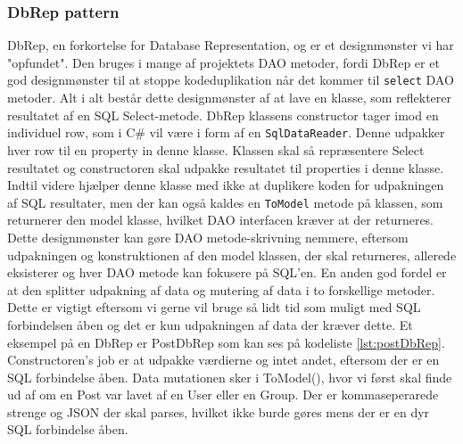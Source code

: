 \subsubsection{DbRep pattern}\label{sec:dbRep}
DbRep, en forkortelse for Database Representation, og er et designmønster vi har "opfundet". Den bruges i mange af projektets DAO metoder, fordi DbRep er et god designmønster til at stoppe kodeduplikation når det kommer til \texttt{select} DAO metoder.
Alt i alt består dette designmønster af at lave en klasse, som reflekterer resultatet af en SQL Select-metode. DbRep klassens constructor tager imod en individuel row, som i C\# vil være i form af en \texttt{SqlDataReader}. Denne udpakker hver row til en property in denne klasse. Klassen skal så repræsentere Select resultatet og constructoren skal udpakke resultatet til properties i denne klasse.
Indtil videre hjælper denne klasse med ikke at duplikere koden for udpakningen af SQL resultater, men der kan også kaldes en \texttt{ToModel} metode på klassen, som returnerer den model klasse, hvilket DAO interfacen kræver at der returneres.
Dette designmønster kan gøre DAO metode-skrivning nemmere, eftersom udpakningen og konstruktionen af den model klassen, der skal returneres, allerede eksisterer og hver DAO metode kan fokusere på SQL'en.
En anden god fordel er at den splitter udpakning af data og mutering af data i to forskellige metoder. Dette er vigtigt eftersom vi gerne vil bruge så lidt tid som muligt med SQL forbindelsen åben og det er kun udpakningen af data der kræver dette.
Et eksempel på en DbRep er PostDbRep som kan ses på kodeliste \ref{lst:postDbRep}. Constructoren's job er at udpakke værdierne og intet andet, eftersom der er en SQL forbindelse åben. Data mutationen sker i ToModel(), hvor vi først skal finde ud af om en Post var lavet af en User eller en Group. Der er kommaseperarede strenge og JSON der skal parses, hvilket ikke burde gøres mens der er en dyr SQL forbindelse åben.

